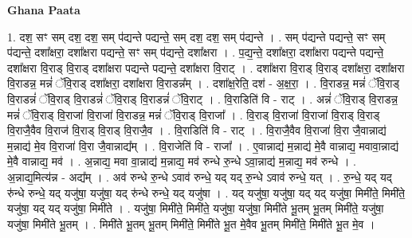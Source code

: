 \documentclass[17pt]{extarticle}
\begin{document}
\textbf{Ghana Paata } \newline

1. दश॒ सꣳ सम् दश॒ दश॒ सम् प॑द्यन्ते पद्यन्ते॒ सम् दश॒ दश॒ सम् प॑द्यन्ते । . सम् प॑द्यन्ते पद्यन्ते॒ सꣳ सम् प॑द्यन्ते॒ दशा᳚क्षरा॒ दशा᳚क्षरा पद्यन्ते॒ सꣳ सम् प॑द्यन्ते॒ दशा᳚क्षरा । . प॒द्य॒न्ते॒ दशा᳚क्षरा॒ दशा᳚क्षरा पद्यन्ते पद्यन्ते॒ दशा᳚क्षरा वि॒राड् वि॒राड् दशा᳚क्षरा पद्यन्ते पद्यन्ते॒ दशा᳚क्षरा वि॒राट् । . दशा᳚क्षरा वि॒राड् वि॒राड् दशा᳚क्षरा॒ दशा᳚क्षरा वि॒राडन्न॒ मन्नं॑ ॅवि॒राड् दशा᳚क्षरा॒ दशा᳚क्षरा वि॒राडन्न᳚म् । . दशा᳚क्ष॒रेति॒ दश॑ - अ॒क्ष॒रा॒ । . वि॒राडन्न॒ मन्नं॑ ॅवि॒राड् वि॒राडन्नं॑ ॅवि॒राड् वि॒राडन्नं॑ ॅवि॒राड् वि॒राडन्नं॑ ॅवि॒राट् । . वि॒राडिति॑ वि - राट् । . अन्नं॑ ॅवि॒राड् वि॒राडन्न॒ मन्नं॑ ॅवि॒राड् वि॒राजा॑ वि॒राजा॑ वि॒राडन्न॒ मन्नं॑ ॅवि॒राड् वि॒राजा᳚ । . वि॒राड् वि॒राजा॑ वि॒राजा॑ वि॒राड् वि॒राड् वि॒राजै॒वैव वि॒राज॑ वि॒राड् वि॒राड् वि॒राजै॒व । . वि॒राडिति॑ वि - राट् । . वि॒राजै॒वैव वि॒राजा॑ वि॒रा जै॒वान्नाद्य॑ म॒न्नाद्य॑ मे॒व वि॒राजा॑ वि॒रा जै॒वान्नाद्य᳚म् । . वि॒राजेति॑ वि - राजा᳚ । . ए॒वान्नाद्य॑ म॒न्नाद्य॑ मे॒वै वान्नाद्य॒ मवावा॒न्नाद्य॑ मे॒वै वान्नाद्य॒ मव॑ । . अ॒न्नाद्य॒ मवा वा॒न्नाद्य॑ म॒न्नाद्य॒ मव॑ रुन्धे रु॒न्धे ऽवा॒न्नाद्य॑ म॒न्नाद्य॒ मव॑ रुन्धे । . अ॒न्नाद्य॒मित्य॑न्न - अद्य᳚म् । . अव॑ रुन्धे रु॒न्धे ऽवाव॑ रुन्धे॒ यद् यद् रु॒न्धे ऽवाव॑ रुन्धे॒ यत् । . रु॒न्धे॒ यद् यद् रु॑न्धे रुन्धे॒ यद् यजु॑षा॒ यजु॑षा॒ यद् रु॑न्धे रुन्धे॒ यद् यजु॑षा । . यद् यजु॑षा॒ यजु॑षा॒ यद् यद् यजु॑षा॒ मिमी॑ते॒ मिमी॑ते॒ यजु॑षा॒ यद् यद् यजु॑षा॒ मिमी॑ते । . यजु॑षा॒ मिमी॑ते॒ मिमी॑ते॒ यजु॑षा॒ यजु॑षा॒ मिमी॑ते भू॒तम् भू॒तम् मिमी॑ते॒ यजु॑षा॒ यजु॑षा॒ मिमी॑ते भू॒तम् । . मिमी॑ते भू॒तम् भू॒तम् मिमी॑ते॒ मिमी॑ते भू॒त मे॒वैव भू॒तम् मिमी॑ते॒ मिमी॑ते भू॒त मे॒व । \newline
\end{document}
